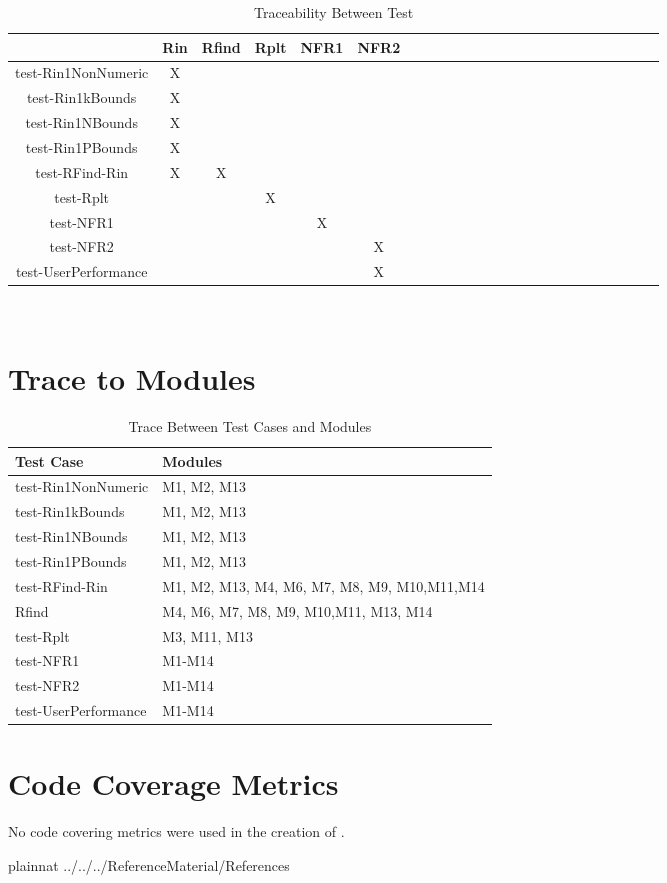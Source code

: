 \documentclass[12pt, titlepage]{article}
\begin{document}
\begin{table}[h]
	\centering
	\begin{tabular}{|c|c|c|c|c|c|c|c|c|c|c|c|c|c|c|c|c|c|c|c|c|c|c|c|}
		\hline        
		& Rin& Rfind & Rplt & NFR1 & NFR2 \\
		\hline
		test-Rin1NonNumeric     &X & & & &  \\ \hline
		test-Rin1kBounds    & X& & & &   \\ \hline
		test-Rin1NBounds    &X & & & &  \\ \hline 
		test-Rin1PBounds    &X & & & &    \\ \hline 
		test-RFind-Rin    &X &X & & &   \\ \hline 
		test-Rplt    & & &X & &    \\ \hline 
		test-NFR1  & & & &X &   \\ \hline 
		test-NFR2  & & & & &X    \\ \hline 
		test-UserPerformance  & & & & &X  \\
		\hline
	\end{tabular}\\
	\caption{Traceability Between Test }
	\label{Table:D_1}
\end{table} 

\section{Trace to Modules}	
\clearpage
\begin{table}
	\centering
	\begin{tabular}{p{} p{}}
		\toprule
		\textbf{Test Case} & \textbf{Modules}\\
		\midrule
		test-Rin1NonNumeric & M1, M2, M13\\
		test-Rin1kBounds & M1, M2, M13\\
		test-Rin1NBounds & M1, M2, M13\\
		test-Rin1PBounds & M1, M2, M13\\
		test-RFind-Rin & M1, M2, M13, M4, M6, M7, M8, M9, M10,M11,M14\\
		Rfind & M4, M6, M7, M8, M9, M10,M11, M13, M14\\
		test-Rplt & M3, M11, M13 \\
		test-NFR1 & M1-M14 \\
		test-NFR2 & M1-M14 \\
		test-UserPerformance & M1-M14 \\
		\bottomrule
	\end{tabular}
	\caption{Trace Between Test Cases and Modules}
	\label{TblRT}
\end{table}	

\section{Code Coverage Metrics} 

No code covering metrics were used in the creation of \progname.

\clearpage
 {plainnat}
 {../../../ReferenceMaterial/References} 
\end{document}
